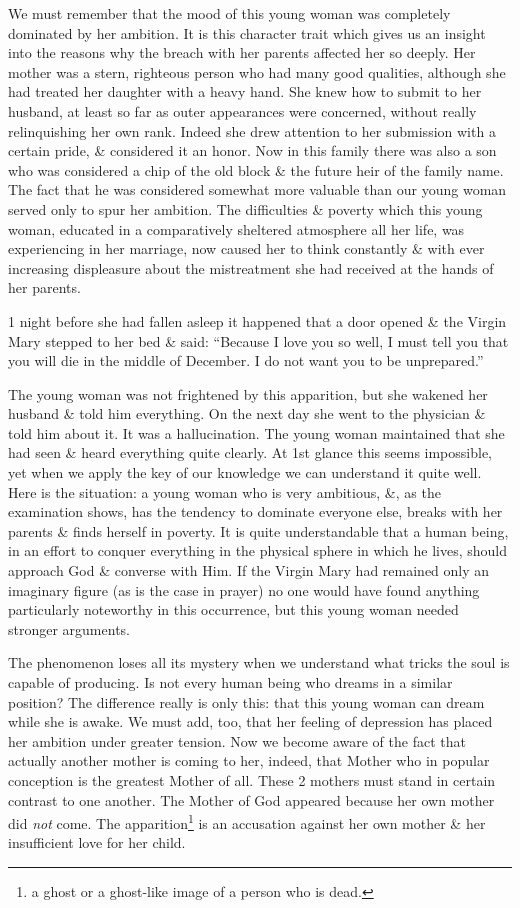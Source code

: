 \documentclass{article}
\begin{document}
We must remember that the mood of this young woman was completely dominated by her ambition. It is this character trait which gives us an insight into the reasons why the breach with her parents affected her so deeply. Her mother was a stern, righteous person who had many good qualities, although she had treated her daughter with a heavy hand. She knew how to submit to her husband, at least so far as outer appearances were concerned, without really relinquishing her own rank. Indeed she drew attention to her submission with a certain pride, \& considered it an honor. Now in this family there was also a son who was considered a chip of the old block \& the future heir of the family name. The fact that he was considered somewhat more valuable than our young woman served only to spur her ambition. The difficulties \& poverty which this young woman, educated in a comparatively sheltered atmosphere all her life, was experiencing in her marriage, now caused her to think constantly \& with ever increasing displeasure about the mistreatment she had received at the hands of her parents.

1 night before she had fallen asleep it happened that a door opened \& the Virgin Mary stepped to her bed \& said: ``Because I love you so well, I must tell you that you will die in the middle of December. I do not want you to be unprepared.''

The young woman was not frightened by this apparition, but she wakened her husband \& told him everything. On the next day she went to the physician \& told him about it. It was a hallucination. The young woman maintained that she had seen \& heard everything quite clearly. At 1st glance this seems impossible, yet when we apply the key of our knowledge we can understand it quite well. Here is the situation: a young woman who is very ambitious, \&, as the examination shows, has the tendency to dominate everyone else, breaks with her parents \& finds herself in poverty. It is quite understandable that a human being, in an effort to conquer everything in the physical sphere in which he lives, should approach God \& converse with Him. If the Virgin Mary had remained only an imaginary figure (as is the case in prayer) no one would have found anything particularly noteworthy in this occurrence, but this young woman needed stronger arguments.

The phenomenon loses all its mystery when we understand what tricks the soul is capable of producing. Is not every human being who dreams in a similar position? The difference really is only this: that this young woman can dream while she is awake. We must add, too, that her feeling of depression has placed her ambition under greater tension. Now we become aware of the fact that actually another mother is coming to her, indeed, that Mother who in popular conception is the greatest Mother of all. These 2 mothers must stand in certain contrast to one another. The Mother of God appeared because her own mother did {\it not} come. The apparition\footnote{a ghost or a ghost-like image of a person who is dead.} is an accusation against her own mother \& her insufficient love for her child.
\end{document}

